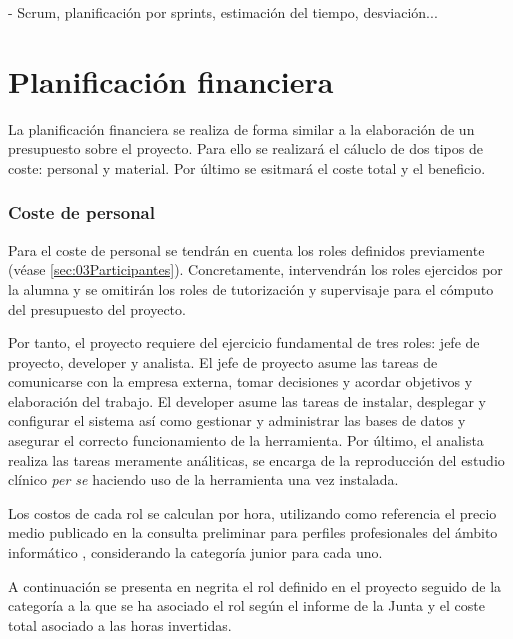 - Scrum, planificación por sprints, estimación del tiempo, desviación...

\section{Planificación financiera} \label{sec:03Costes}

La planificación financiera se realiza de forma similar a la elaboración de un presupuesto sobre el proyecto. Para ello se realizará el cáluclo de dos tipos de coste: personal y material. Por último se esitmará el coste total y el beneficio.

\subsubsection{Coste de personal}

Para el coste de personal se tendrán en cuenta los roles definidos previamente (véase \ref{sec:03Participantes}). Concretamente, intervendrán los roles ejercidos por la alumna y se omitirán los roles de tutorización y supervisaje para el cómputo del presupuesto del proyecto.

Por tanto, el proyecto requiere del ejercicio fundamental de tres roles: jefe de proyecto, developer y analista. El jefe de proyecto asume las tareas de comunicarse con la empresa externa, tomar decisiones y acordar objetivos y elaboración del trabajo. El developer asume las tareas de instalar, desplegar y configurar el sistema así como gestionar y administrar las bases de datos y asegurar el correcto funcionamiento de la herramienta. Por último, el analista realiza las tareas meramente análiticas, se encarga de la reproducción del estudio clínico \textit{per se} haciendo uso de la herramienta una vez instalada.

Los costos de cada rol se calculan por hora, utilizando como referencia el precio medio publicado en la consulta preliminar para perfiles profesionales del ámbito informático \cite{informeJuntaAndalucia}, considerando la categoría junior para cada uno. 

A continuación se presenta en negrita el rol definido en el proyecto seguido de la categoría a la que se ha asociado el rol según el informe de la Junta y el coste total asociado a las horas invertidas.

